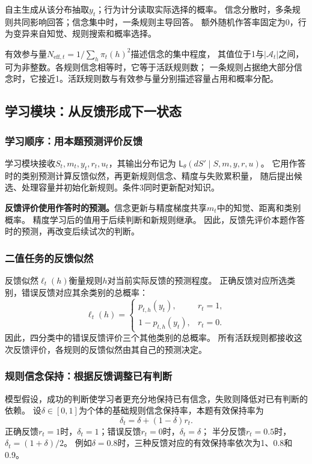 \documentclass[11pt,a4paper]{article}
\numberwithin{equation}{section}
\newcommand{\A}{\mathcal{A}}
\newcommand{\Ll}{\mathsf{L}}
\begin{document}
自主生成从该分布抽取$y_t$；行为计分读取实际选择的概率。
信念分散时，多条规则共同影响回答；信念集中时，一条规则主导回答。
额外随机作答率固定为0，行为变异来自知觉、规则搜索和概率选择。

有效参与量$N_{\mathrm{eff},t}=1/\sum_h\pi_t(h)^2$描述信念的集中程度，
其值位于1与$|\A_t|$之间，可为非整数。各规则信念相等时，它等于活跃规则数；
一条规则占据绝大部分信念时，它接近1。活跃规则数与有效参与量分别描述容量占用和概率分配。

\subsection{学习模块：从反馈形成下一状态}
\label{sec:learning}

\subsubsection{学习顺序：用本题预测评价反馈}
学习模块接收$S_t,m_t,y_t,r_t,u_t$，其输出分布记为
$\Ll_\theta(dS'\mid S,m,y,r,u)$。
它用作答时的类别预测计算反馈似然，再更新规则信念、精度与失败累积量，
随后提出候选、处理容量并初始化新规则。条件3同时更新配对知识。

\textbf{反馈评价使用作答时的预测。}信念更新与精度梯度共享$m_t$中的知觉、距离和类别概率。
精度学习后的值用于后续判断和新规则继承。
因此，反馈先评价本题作答时的预测，再改变后续试次的判断。

\subsubsection{二值任务的反馈似然}
反馈似然$\ell_t(h)$衡量规则$h$对当前实际反馈的预测程度。
正确反馈对应所选类别，错误反馈对应其余类别的总概率：
\begin{equation}
\ell_t(h)=
\begin{cases}
p_{t,h}(y_t),&r_t=1,\\
1-p_{t,h}(y_t),&r_t=0.
\end{cases}
\label{eq:binary-feedback}
\end{equation}
因此，四分类中的错误反馈评价三个其他类别的总概率。
所有活跃规则都接收这次反馈评价，各规则的反馈似然由其自己的预测决定。

\subsubsection{规则信念保持：根据反馈调整已有判断}
\label{sec:retention}
模型假设，成功的判断使学习者更充分地保持已有信念，失败则降低对已有判断的依赖。
设$\delta\in[0,1]$为个体的基础规则信念保持率，本题有效保持率为
\begin{equation}
\delta_t=\delta+(1-\delta)r_t.
\label{eq:effective-retention}
\end{equation}
正确反馈$r_t=1$时，$\delta_t=1$；错误反馈$r_t=0$时，$\delta_t=\delta$；
半分反馈$r_t=0.5$时，$\delta_t=(1+\delta)/2$。
例如$\delta=0.8$时，三种反馈对应的有效保持率依次为1、0.8和0.9。
\end{document}
